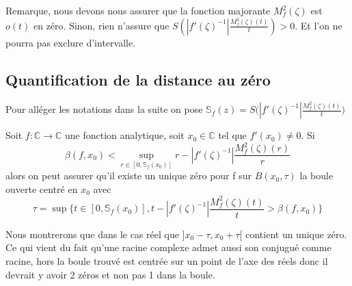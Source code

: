 \documentclass[a4paper,10.5pt]{article}
\begin{document}
	\noindent Remarque, nous devons nous assurer que la fonction majorante $M_{f}^{2}(\zeta)$ est $o(t)$ en zéro. Sinon, rien n'assure que $S(|f'(\zeta)^{-1}|\frac{M_{f}^{2}(\zeta)(t)}{t})>0$. Et l'on ne pourra pas exclure d'intervalle.
	
	
	\subsection{Quantification de la distance au zéro}
	Pour alléger les notations dans la suite on pose $\mathbb{S}_{f}(z)=S\Big(|f'(\zeta)^{-1}|\frac{M_{f}^{2}(\zeta)(t)}{t}\Big)$
	
	\begin{theorem} Soit $f:\mathbb{C} \rightarrow \mathbb{C}$ une fonction analytique, soit $x_0 \in \mathbb{C}$ tel que $f'(x_0) \neq 0$. Si 
	\[\beta(f,x_0)<\sup_{r \in [0,\mathbb{S}_{f}(x_0)]} r-|f'(\zeta)^{-1}|\frac{M_{f}^{2}(\zeta)(r)}{r}\]
	 alors on peut assurer qu'il existe un unique zéro pour f sur $B(x_0,\tau)$ la boule ouverte centré en $x_0$ avec
	 \[\tau=\sup \Big\{t \in [0,\mathbb{S}_{f}(x_0)],  t-|f'(\zeta)^{-1}|\frac{M_{f}^{2}(\zeta)(t)}{t}>\beta(f,x_0)\Big\} \]
	\end{theorem}
	 Nous montrerons que dans le cas réel que $]x_0-\tau,x_0+\tau[$ contient un unique zéro. Ce qui vient du fait qu'une racine complexe admet aussi son conjugué comme racine, hors la boule trouvé est centrée sur un point de l'axe des réels donc il devrait y avoir 2 zéros et non pas 1 dans la boule.
	 
	 \vspace{7mm}	
\end{document}
